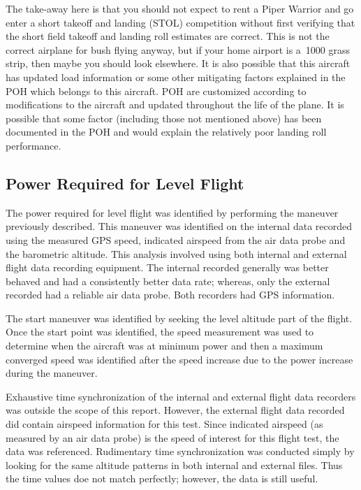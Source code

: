 \documentclass[conf]{new-aiaa}
\begin{document}
The take-away here is that you should not expect to rent a Piper Warrior and go enter a short takeoff and landing (STOL) competition without first verifying that the short field takeoff and landing roll estimates are correct. This is not the correct airplane for bush flying anyway, but if your home airport is a~\SI{1000}{\foot} grass strip, then maybe you should look elsewhere. It is also possible that this aircraft has updated load information or some other mitigating factors explained in the POH which belongs to this aircraft. POH are customized according to modifications to the aircraft and updated throughout the life of the plane. It is possible that some factor (including those not mentioned above) has been documented in the POH and would explain the relatively poor landing roll performance.

\FloatBarrier

\subsection{Power Required for Level Flight}

The power required for level flight was identified by performing the maneuver previously described. This maneuver was identified on the internal data recorded using the measured GPS speed, indicated airspeed from the air data probe and the barometric altitude. This analysis involved using both internal and external flight data recording equipment. The internal recorded generally was better behaved and had a consistently better data rate; whereas, only the external recorded had a reliable air data probe. Both recorders had GPS information.

The start maneuver was identified by seeking the level altitude part of the flight. Once the start point was identified, the speed measurement was used to determine when the aircraft was at minimum power and then a maximum converged speed was identified after the speed increase due to the power increase during the maneuver.

Exhaustive time synchronization of the internal and external flight data recorders was outside the scope of this report. However, the external flight data recorded did contain airspeed information for this test. Since indicated airspeed (as measured by an air data probe) is the speed of interest for this flight test, the data was referenced. Rudimentary time synchronization was conducted simply by looking for the same altitude patterns in both internal and external files. Thus the time values doe not match perfectly; however, the data is still useful.
\end{document}
